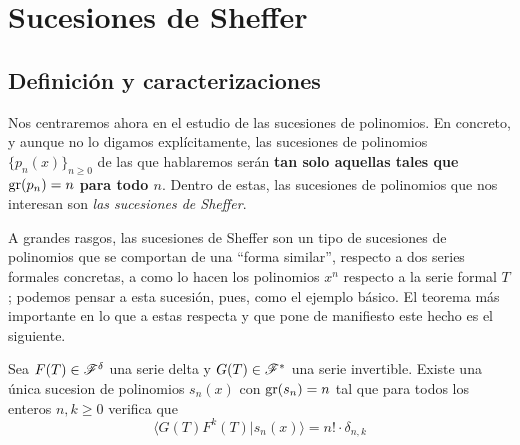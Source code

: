 \chapter{Sucesiones de Sheffer}

\section{Definición y caracterizaciones}

Nos centraremos ahora en el estudio de las sucesiones de polinomios. En concreto, y aunque no lo digamos explícitamente, las sucesiones de polinomios $\{ p_n(x) \}_{n \geq 0}$ de las que hablaremos serán \textbf{tan solo aquellas tales que $\operatorname{gr}(p_n) = n$ para todo $n$}. Dentro de estas, las sucesiones de polinomios que nos interesan son \textit{las sucesiones de Sheffer}. 

A grandes rasgos, las sucesiones de Sheffer son un tipo de sucesiones de polinomios que se comportan de una ``forma similar'', respecto a dos series formales concretas, a como lo hacen los polinomios $x^n$ respecto a la serie formal $T$; podemos pensar a esta sucesión, pues, como el ejemplo básico. El teorema más importante en lo que a estas respecta y que pone de manifiesto este hecho es el siguiente.

\begin{teorema} 
    Sea $F(T) \in \mathscr{F}^{\delta}$ una serie delta y $G(T) \in \mathscr{F}^*$ una serie invertible. Existe una única sucesion de polinomios $s_n(x)$ con $\operatorname{gr}(s_n) = n$ tal que para todos los enteros $n, k \geq 0$ verifica que
    \begin{equation}\label{sucesion de sheffer}
        \langle G(T)F^k(T)| s_n(x) \rangle = n! \cdot \delta_{n,k}
    \end{equation}
\end{teorema}

